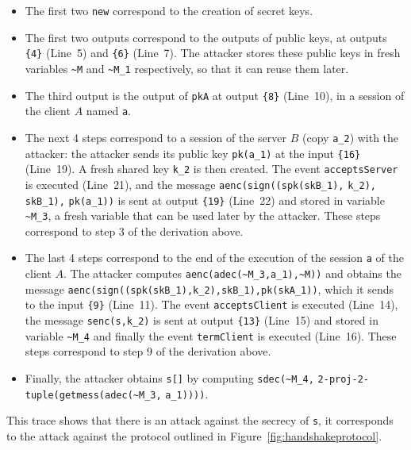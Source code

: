 \documentclass{book}
\begin{document}
\begin{itemize}
\item The first two \lstinline!new! correspond to the creation of secret keys.

\item The first two outputs correspond to the outputs of public keys, at outputs \lstinline!{4}! (Line~5) and \lstinline!{6}! (Line~7). The attacker stores these public keys in fresh variables \lstinline!~M! and \lstinline!~M_1! respectively, so that it can reuse them later.

\item The third output is the output of \lstinline!pkA! at output \lstinline!{8}! (Line~10), in a session of the client $A$ named \lstinline!a!.

\item The next 4 steps correspond to a session of the server $B$ (copy \lstinline!a_2!) with the attacker: the attacker sends its public key \lstinline!pk(a_1)! at the input \lstinline!{16}! (Line~19). A fresh shared key \lstinline!k_2! is then created. The event \lstinline!acceptsServer! is executed (Line~21), and the message \lstinline!aenc(sign((spk(skB_1),! \lstinline!k_2),! \lstinline!skB_1),! \lstinline!pk(a_1))! is sent at output \lstinline!{19}! (Line~22) and stored in variable \lstinline!~M_3!, a fresh variable that can be used later by the attacker. These steps correspond to step 3 of the derivation above.

\sloppy

\item The last 4 steps correspond to the end of the execution of the session \lstinline!a! of the client $A$. The attacker computes \lstinline!aenc(adec(~M_3,a_1),~M))! and obtains the message \lstinline!aenc(sign((spk(skB_1),k_2),skB_1),pk(skA_1))!, which it sends to the input \lstinline!{9}! (Line~11). The event \lstinline!acceptsClient! is executed (Line~14), the message \lstinline!senc(s,k_2)! is sent at output \lstinline!{13}! (Line~15) and stored in variable \lstinline!~M_4! and finally the event \lstinline!termClient! is executed (Line~16). These steps correspond to step 9 of the derivation above.

\fussy

\item Finally, the attacker obtains \lstinline!s[]! by computing \lstinline!sdec(~M_4,! \lstinline!2-proj-2-tuple(getmess(adec(!\allowbreak\lstinline!~M_3,! \lstinline!a_1))))!.
\end{itemize}
This trace shows that there is an attack against the secrecy of \lstinline!s!, it corresponds to the attack against the protocol outlined in Figure~\ref{fig:handshakeprotocol}.
\end{document}
